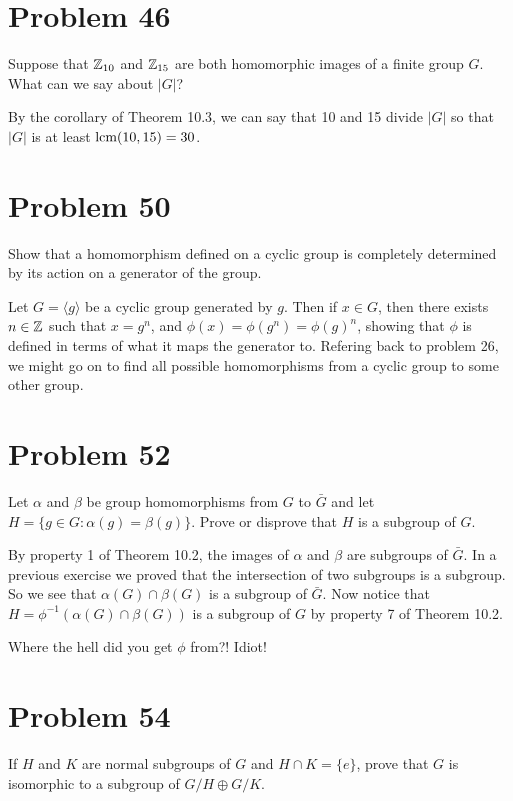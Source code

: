 \documentclass{article}
\begin{document}
\section*{Problem 46}

Suppose that $\mathbb{Z}_{10}$ and $\mathbb{Z}_{15}$ are both homomorphic images of a finite group $G$.
What can we say about $|G|$?

By the corollary of Theorem 10.3, we can say that 10 and 15 divide $|G|$ so that
$|G|$ is at least $\mbox{lcm}(10,15)=30$.

\section*{Problem 50}

Show that a homomorphism defined on a cyclic group is completely
determined by its action on a generator of the group.

Let $G=\langle g\rangle$ be a cyclic group generated by $g$.  Then if $x\in G$,
then there exists $n\in\mathbb{Z}$ such that $x=g^n$, and $\phi(x)=\phi(g^n)=\phi(g)^n$,
showing that $\phi$ is defined in terms of what it maps the generator to.
Refering back to problem 26, we might go on to find all possible homomorphisms
from a cyclic group to some other group.

\section*{Problem 52}

Let $\alpha$ and $\beta$ be group homomorphisms from $G$ to $\bar{G}$ and let
$H=\{g\in G:\alpha(g)=\beta(g)\}$.  Prove or disprove that $H$ is a subgroup of $G$.

By property 1 of Theorem 10.2, the images of $\alpha$ and $\beta$ are subgroups of $\bar{G}$.
In a previous exercise we proved that the intersection of two subgroups is a subgroup.
So we see that $\alpha(G)\cap\beta(G)$ is a subgroup of $\bar{G}$.
Now notice that $H=\phi^{-1}(\alpha(G)\cap\beta(G))$ is a subgroup of $G$
by property 7 of Theorem 10.2.

Where the hell did you get $\phi$ from?!  Idiot!

\section*{Problem 54}

If $H$ and $K$ are normal subgroups of $G$ and $H\cap K=\{e\}$, prove that $G$
is isomorphic to a subgroup of $G/H\oplus G/K$.
\end{document}
